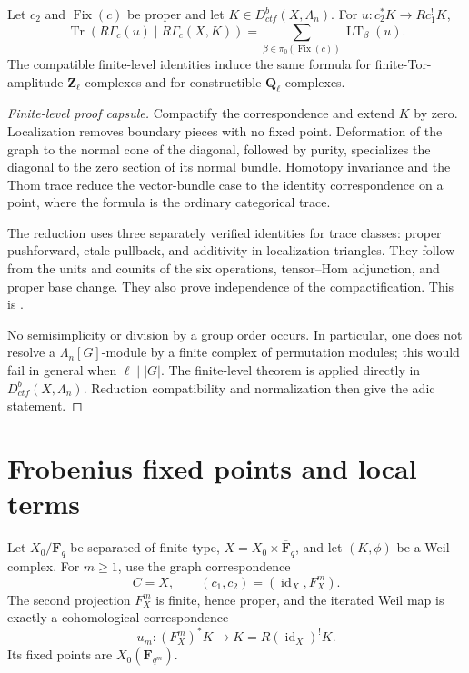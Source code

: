 \begin{theorem}
\label{thm:lefschetz-verdier}
Let \(c_2\) and \(\operatorname{Fix}(c)\) be proper and let
\(K\in D^b_{ctf}(X,\Lambda_n)\).  For
\(u:c_2^*K\to Rc_1^!K\),
\[
 \operatorname{Tr}(R\Gamma_c(u)\mid R\Gamma_c(X,K))
 =
 \sum_{\beta\in\pi_0(\operatorname{Fix}(c))}
 \operatorname{LT}_\beta(u).
\]
The compatible finite-level identities induce the same formula for
finite-Tor-amplitude \(\mathbf Z_\ell\)-complexes and for constructible
\(\mathbf Q_\ell\)-complexes.
\end{theorem}

\begin{proof}[Finite-level proof capsule]
Compactify the correspondence and extend \(K\) by zero.  Localization removes
boundary pieces with no fixed point.  Deformation of the graph to the normal
cone of the diagonal, followed by purity, specializes the diagonal to the
zero section of its normal bundle.  Homotopy invariance and the Thom trace
reduce the vector-bundle case to the identity correspondence on a point,
where the formula is the ordinary categorical trace.

The reduction uses three separately verified identities for trace classes:
proper pushforward, etale pullback, and additivity in localization triangles.
They follow from the units and counits of the six operations, tensor--Hom
adjunction, and proper base change.  They also prove independence of the
compactification.  This is \cite[Expos\'e III]{SGA5}.

No semisimplicity or division by a group order occurs.  In particular, one
does not resolve a \(\Lambda_n[G]\)-module by a finite complex of permutation
modules; this would fail in general when \(\ell\mid|G|\).  The finite-level
theorem is applied directly in \(D^b_{ctf}(X,\Lambda_n)\).  Reduction
compatibility and normalization then give the adic statement.
\end{proof}

\section{Frobenius fixed points and local terms}

Let \(X_0/\mathbf F_q\) be separated of finite type,
\(X=X_0\times\overline{\mathbf F}_q\), and let \((K,\phi)\) be a Weil
complex.  For \(m\geq1\), use the graph correspondence
\[
 C=X,\qquad (c_1,c_2)=(\operatorname{id}_X,F_X^m).
\]
The second projection \(F_X^m\) is finite, hence proper, and the iterated Weil
map is exactly a cohomological correspondence
\[
 u_m:(F_X^m)^*K\longrightarrow K=R(\operatorname{id}_X)^!K.
\]
Its fixed points are \(X_0(\mathbf F_{q^m})\).


